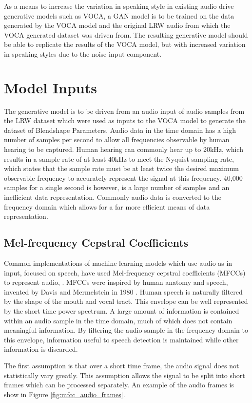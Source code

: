 As a means to increase the variation in speaking style in existing audio drive generative models such as VOCA, a GAN model is to be trained on the data generated by the VOCA model and the original LRW audio from which the VOCA generated dataset was driven from.
The resulting generative model should be able to replicate the results of the VOCA model, but with increased variation in speaking styles due to the noise input component.

\section{Model Inputs}
The generative model is to be driven from an audio input of audio samples from the LRW dataset which were used as inputs to the VOCA model to generate the dataset of Blendshape Parameters.
Audio data in the time domain has a high number of samples per second to allow all frequencies observable by human hearing to be captured.
Human hearing can commonly hear up to 20kHz, which results in a sample rate of at least 40kHz to meet the Nyquist sampling rate, which states that the sample rate must be at least twice the desired maximum observable frequency to accurately represent the signal at this frequency.
40,000 samples for a single second is however, is a large number of samples and an inefficient data representation.
Commonly audio data is converted to the frequency domain which allows for a far more efficient means of data representation. 

\subsection{Mel-frequency Cepstral Coefficients}
Common implementations of machine learning models which use audio as in input, focused on speech, have used Mel-frequency cepstral coefficients (MFCCs) to represent audio, \cite{Holmberg2006, Milner2007, Murty2006}.
MFCCs were inspired by human anatomy and speech, invented by Davis and Mermelstein in 1980 \cite{Davis1980}.
Human speech is naturally filtered by the shape of the mouth and vocal tract.
This envelope can be well represented by the short time power spectrum.
A large amount of information is contained within an audio sample in the time domain, much of which does not contain meaningful information.
By filtering the audio sample in the frequency domain to this envelope, information useful to speech detection is maintained while other information is discarded.

The first assumption is that over a short time frame, the audio signal does not statistically vary greatly.
This assumption allows the signal to be split into short frames which can be processed separately.
An example of the audio frames is show in Figure \ref{fig:mfcc_audio_frames}.

